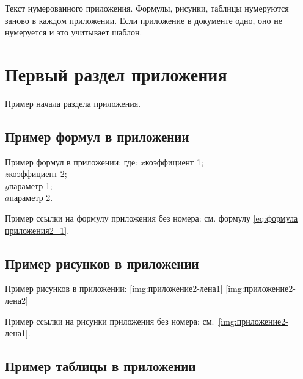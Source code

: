 \newpage{}
\setcounter{equation}{0} %
\setcounter{table}{0} %
\setcounter{illustration}{0} %
\setcounter{section}{0} %

Текст нумерованного приложения. Формулы, рисунки, таблицы нумеруются заново в каждом приложении. Если приложение в документе одно, оно не нумеруется и это учитывает шаблон.

\section{Первый раздел приложения}

Пример начала раздела приложения.

\subsection{Пример формул в приложении}

Пример формул в приложении:
%
\noindent где: $x$\ndash коэффициент 1; \\
\indent $z$\ndash коэффициент 2;\\
\indent $y$\ndash параметр 1;\\
\indent $a$\ndash параметр 2.

Пример ссылки на формулу приложения без номера: см. формулу \ref{eq:формула приложения2_1}.

\subsection{Пример рисунков в приложении}

Пример рисунков в приложении:
[img:приложение2-лена1]
[img:приложение2-лена2]

Пример ссылки на рисунки приложения без номера: см.~\ref{img:приложение2-лена1}.

\subsection{Пример таблицы в приложении}

